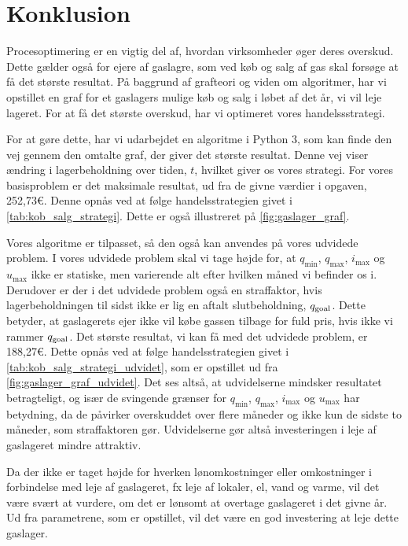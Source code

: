 \chapter{Konklusion}
Procesoptimering er en vigtig del af, hvordan virksomheder øger deres overskud. Dette gælder også for ejere af gaslagre, som ved køb og salg af gas skal forsøge at få det største resultat. På baggrund af grafteori og viden om algoritmer, har vi opstillet en graf for et gaslagers mulige køb og salg i løbet af det år, vi vil leje lageret. For at få det største overskud, har vi optimeret vores handelssstrategi. 

For at gøre dette, har vi udarbejdet en algoritme i Python 3, som kan finde den vej gennem den omtalte graf, der giver det største resultat. Denne vej viser ændring i lagerbeholdning over tiden, $t$, hvilket giver os vores strategi. For vores basisproblem er det maksimale resultat, ud fra de givne værdier i opgaven, 252,73€. Denne opnås ved at følge handelsstrategien givet i \autoref{tab:kob_salg_strategi}. Dette er også illustreret på \autoref{fig:gaslager_graf}. 

Vores algoritme er tilpasset, så den også kan anvendes på vores udvidede problem. I vores udvidede problem skal vi tage højde for, at $q_{\min}$, $q_{\max}$, $i_{\max}$ og $u_{\max}$ ikke er statiske, men varierende alt efter hvilken måned vi befinder os i. Derudover er der i det udvidede problem også en straffaktor, hvis lagerbeholdningen til sidst ikke er lig en aftalt slutbeholdning, $q_{\textrm{goal}}$. Dette betyder, at gaslagerets ejer ikke vil købe gassen tilbage for fuld pris, hvis ikke vi rammer $q_{\textrm{goal}}$. Det største resultat, vi kan få med det udvidede problem, er 188,27€. Dette opnås ved at følge handelsstrategien givet i \autoref{tab:kob_salg_strategi_udvidet}, som er opstillet ud fra \autoref{fig:gaslager_graf_udvidet}.
Det ses altså, at udvidelserne mindsker resultatet betragteligt, og især de svingende grænser for $q_{\min}$, $q_{\max}$, $i_{\max}$ og $u_{\max}$ har betydning, da de påvirker overskuddet over flere måneder og ikke kun de sidste to måneder, som straffaktoren gør. 
Udvidelserne gør altså investeringen i leje af gaslageret mindre attraktiv.

Da der ikke er taget højde for hverken lønomkostninger eller omkostninger i forbindelse med leje af gaslageret, fx leje af lokaler, el, vand og varme, vil det være svært at vurdere, om det er lønsomt at overtage gaslageret i det givne år. Ud fra parametrene, som er opstillet, vil det være en god investering at leje dette gaslager. 


